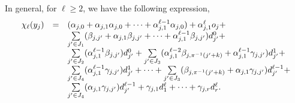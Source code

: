 \documentclass[runningheads,a4paper]{llncs}
\begin{document}
In general, for $\ell \ge 2$, we have the following expression,
\[
\begin{array}{l c l}
\chi_\ell(y_j)  & = & (\alpha_{j,0} + \alpha_{j,1} \alpha_{j,0}+ \dots +\alpha^{\ell-1}_{j,1} \alpha_{j,0}) + \alpha^\ell_{j,1} o_j + \\
& & \sum \limits_{j' \in J_1} (\beta_{j,j'}+\alpha_{j,1}\beta_{j,j'} + \dots +\alpha^{\ell-1}_{j,1}  \beta_{j,j'}) d^0_{j'} + \\
%
& & \sum \limits_{j' \in J_2} (\alpha^{\ell-1}_{j,1}\beta_{j,j'}) d^0_{j'} +  \sum \limits_{j' \in J_3} (\alpha^{\ell-2}_{j,1}\beta_{j, \pi^{-1}(j'+k)}+\alpha^{\ell-1}_{j,1}\gamma_{j,j'}) d^1_{j'} + \\
%
& & \sum \limits_{j' \in J_4} (\alpha^{\ell-1}_{j,1} \gamma_{j,j'}) d^1_{j'} + \dots + \sum \limits_{j' \in J_3} (\beta_{j, \pi^{-1}(j'+k)}+\alpha_{j,1}\gamma_{j,j'}) d^{\ell-1}_{j'} + \\
%
& & \sum \limits_{j' \in J_4} (\alpha_{j,1} \gamma_{j,j'}) d^{\ell-1}_{j'} + \gamma_{j, 1} d^\ell_{1} + \dots + \gamma_{j,r} d^\ell_{r}.
\end{array} 
\]
\end{document}
